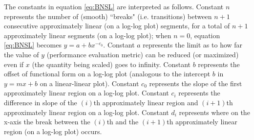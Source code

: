 \documentclass{article} %
\begin{document}

The constants in equation \ref{eq:BNSL} are interpreted as follows. Constant $n$ represents the number of (smooth) ``breaks" (i.e. transitions) between $n+1$ consecutive approximately linear (on a log-log plot) segments, for a total of $n+1$  approximately linear segments (on a log-log plot); 
when $n=0$, equation \ref{eq:BNSL} becomes $y=a+bx^{-c_0}$.
Constant $a$ represents the limit as to how far the value of $y$ (performance evaluation metric) can be reduced (or maximized) even if $x$ (the quantity being scaled) goes to infinity. Constant $b$ represents the offset of functional form on a log-log plot (analogous to the intercept $b$ in $y=mx+b$ on a linear-linear plot). Constant $c_0$ represents the slope of the first approximately linear region on a log-log plot. Constant $c_i$ represents the difference in slope of the $(i)$th approximately linear region and $(i+1)$th approximately linear region on a log-log plot. Constant $d_i$ represents where on the x-axis the break between the $(i)$th and the $(i+1)$th approximately linear region (on a log-log plot) occurs. %
\end{document}
